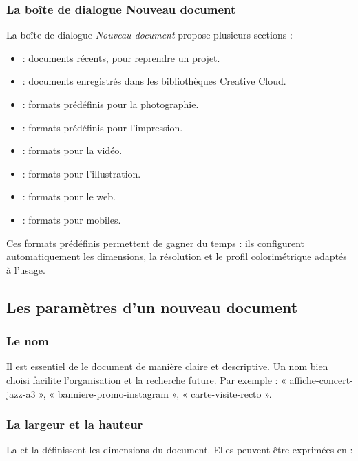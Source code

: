 \subsubsection{La boîte de dialogue Nouveau document}

La boîte de dialogue \emph{Nouveau document} propose plusieurs sections :

\begin{itemize}
    \item {} : documents récents, pour reprendre un projet.
    \item {} : documents enregistrés dans les bibliothèques Creative Cloud.
    \item {} : formats prédéfinis pour la photographie.
    \item {} : formats prédéfinis pour l'impression.
    \item {} : formats pour la vidéo.
    \item {} : formats pour l'illustration.
    \item {} : formats pour le web.
    \item {} : formats pour mobiles.
\end{itemize}

Ces formats prédéfinis permettent de gagner du temps : ils configurent automatiquement les dimensions, la résolution et le profil colorimétrique adaptés à l'usage.

\subsection{Les paramètres d'un nouveau document}

\subsubsection{Le nom}

Il est essentiel de  le document de manière claire et descriptive. Un nom bien choisi facilite l'organisation et la recherche future. Par exemple : « affiche-concert-jazz-a3 », « banniere-promo-instagram », « carte-visite-recto ».

\subsubsection{La largeur et la hauteur}

La  et la  définissent les dimensions du document. Elles peuvent être exprimées en :


